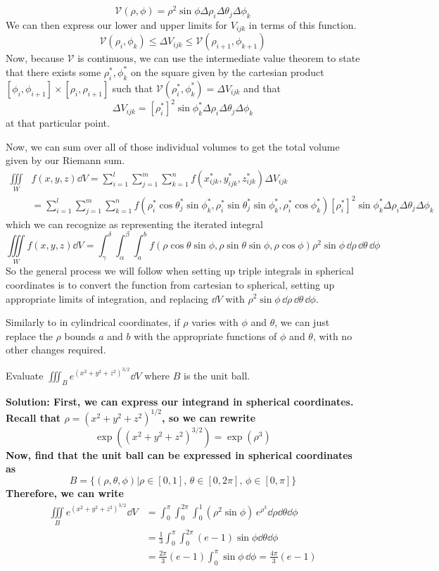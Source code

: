 \[ \mathcal{V}(\rho, \phi) = \rho^2 \sin \phi \Delta \rho_i\Delta \theta_j \Delta \phi_k  \]
We can then express our lower and upper limits for $V_{ijk}$ in terms of this function.
\[ \mathcal{V} (\rho_i, \phi_k) \leq \Delta V_{ijk} \leq \mathcal{V}(\rho_{i+1}, \phi_{k+1}) \]
Now, because $\mathcal{V}$ is continuous, we can use the intermediate value theorem to state that there exists some $\rho_i^*, \phi_k^*$ on the square given by the cartesian product $[\phi_i, \phi_{i+1}]\times[\rho_i, \rho_{i+1}]$ such that $\mathcal{V}(\rho_i^*, \phi_k^*) = \Delta V_{ijk}$ and that
\[ \Delta V_{ijk} = [\rho_i^*]^2 \sin \phi_k^* \Delta \rho_i\Delta \theta_j \Delta \phi_k \]
at that particular point. \par
Now, we can sum over all of those individual volumes to get the total volume given by our Riemann sum. 
\begin{align*}
    \iiint\limits_W &f(x,y,z)\dd V = \sum_{i=1}^{l}\sum_{j=1}^m\sum_{k=1}^n f(x^*_{ijk}, y^*_{ijk}, z^*_{ijk})\Delta V_{ijk} \\
    &= \sum_{i=1}^{l}\sum_{j=1}^m\sum_{k=1}^n f(\rho_i^*\cos\theta_j^*\sin\phi_k^*, \rho_i^*\sin\theta_j^*\sin\phi_k^*, \rho_i^*\cos\phi_k^*)[\rho_i^*]^2 \sin \phi_k^* \Delta \rho_i\Delta \theta_j \Delta \phi_k
\end{align*}
which we can recognize as representing the iterated integral
\[ \iiint\limits_W f(x,y,z)\dd V = \int_\gamma^\delta\int_\alpha^\beta\int_a^b f(\rho \cos\theta\sin\phi, \rho\sin\theta\sin\phi, \rho\cos\phi)\rho^2\sin\phi \, \dd \rho \, \dd \theta \, \dd \phi \]
So the general process we will follow when setting up triple integrals in spherical coordinates is to convert the function from cartesian to spherical, setting up appropriate limits of integration, and replacing $\dd V$ with $\rho^2\sin\phi \, \dd \rho\,\dd \theta\, \dd \phi$.\par 
Similarly to in cylindrical coordinates, if $\rho$ varies with $\phi$ and $\theta$, we can just replace the $\rho$ bounds $a$ and $b$ with the appropriate functions of $\phi$ and $\theta$, with no other changes required. 
\begin{example}
    Evaluate $\iiint_B e^{(x^2+y^2+z^2)^{3/2}}\dd V$ where $B$ is the unit ball. \par
    \bf{Solution: } First, we can express our integrand in spherical coordinates. Recall that $\rho=(x^2+y^2+z^2)^{1/2}$, so we can rewrite
    \[ \exp((x^2+y^2+z^2)^{3/2}) = \exp (\rho^3) \] 
    Now, find that the unit ball can be expressed in spherical coordinates as
    \[ B = \{(\rho, \theta, \phi)|\rho\in[0,1], \, \theta\in[0,2\pi],\, \phi\in[0,\pi] \} \]
    Therefore, we can write
    \begin{align*}
        \iiint\limits_B e^{(x^2+y^2+z^2)^{3/2}}\dd V &= \int_0^{\pi}\int_0^{2\pi}\int_0^1(\rho^2\sin\phi)\, e^{\rho^3}\dd \rho\dd \theta\dd \phi \\
        &= \frac{1}{3}\int_0^\pi \int_0^{2\pi}(e-1)\sin\phi\dd \theta\dd \phi \\
        &= \frac{2\pi}{3}(e-1)\int_0^{\pi }\sin\phi \, \dd \phi = \boxed{\frac{4\pi}{3}(e-1)}
    \end{align*}
\end{example}
